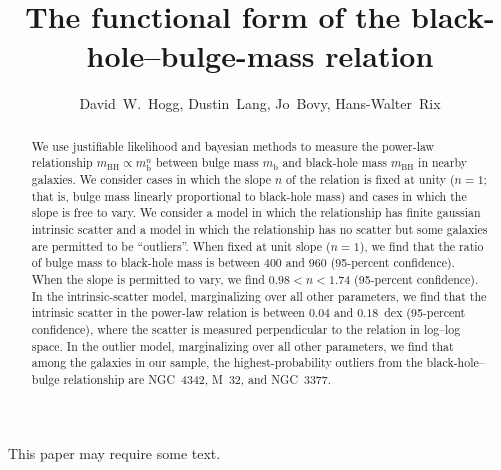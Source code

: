 \documentclass[12pt,preprint]{aastex}
\newcounter{address}
\newcommand{\mbulge}{m_{\mathrm{b}}}
\newcommand{\mbh}{m_{\mathrm{BH}}}
\newcommand{\slope}{n}
\begin{document}
\title{The functional form of the black-hole--bulge-mass relation}
\author{David~W.~Hogg\altaffilmark{\ref{CCPP},\ref{MPIA},\ref{email}},
        Dustin~Lang\altaffilmark{\ref{UofT},\ref{Princeton}},
        Jo~Bovy\altaffilmark{\ref{CCPP}},
        Hans-Walter~Rix\altaffilmark{\ref{MPIA}}}

\begin{abstract}
We use justifiable likelihood and bayesian methods to measure the
power-law relationship $\mbh\propto\mbulge^\slope$ between bulge mass
$\mbulge$ and black-hole mass $\mbh$ in nearby galaxies.  We consider
cases in which the slope $\slope$ of the relation is fixed at unity
($\slope=1$; that is, bulge mass linearly proportional to black-hole
mass) and cases in which the slope is free to vary.  We consider a
model in which the relationship has finite gaussian intrinsic scatter
and a model in which the relationship has no scatter but some galaxies
are permitted to be ``outliers''.  When fixed at unit slope
($\slope=1$), we find that the ratio of bulge mass to black-hole mass
is between 400 and 960 (95-percent confidence).  When the slope is
permitted to vary, we find $0.98<\slope<1.74$ (95-percent confidence).
In the intrinsic-scatter model, marginalizing over all other
parameters, we find that the intrinsic scatter in the power-law
relation is between $0.04$ and $0.18$~dex (95-percent confidence),
where the scatter is measured perpendicular to the relation in
log--log space.  In the outlier model, marginalizing over all other
parameters, we find that among the galaxies in our sample, the
highest-probability outliers from the black-hole--bulge relationship
are NGC~4342, M~32, and NGC~3377.
\end{abstract}

This paper may require some text.
\end{document}
